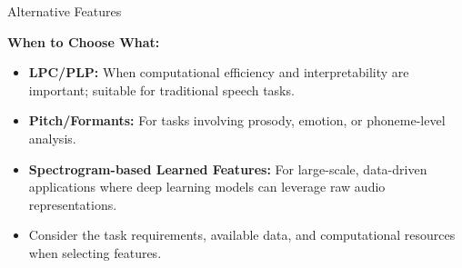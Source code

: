 \begin{frame}[allowframebreaks]{Alternative Features}
\framebreak

\textbf{When to Choose What:}
\begin{itemize}
    \item \textbf{LPC/PLP:} When computational efficiency and interpretability are important; suitable for traditional speech tasks.
    \item \textbf{Pitch/Formants:} For tasks involving prosody, emotion, or phoneme-level analysis.
    \item \textbf{Spectrogram-based Learned Features:} For large-scale, data-driven applications where deep learning models can leverage raw audio representations.
    \item Consider the task requirements, available data, and computational resources when selecting features.
\end{itemize}
\end{frame}